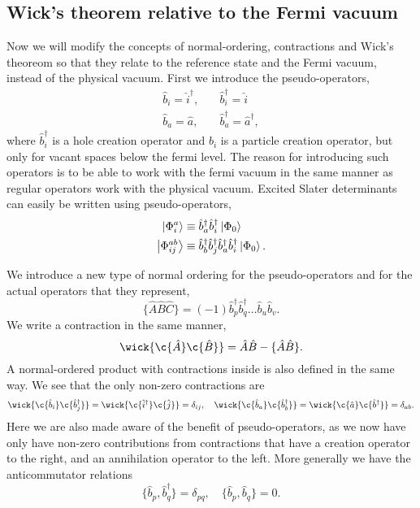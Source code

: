 	\subsection{Wick's theorem relative to the Fermi vacuum}

		Now we will modify the concepts of normal-ordering, contractions and Wick's 
        theoreom so that they relate to the reference state and the 
        Fermi vacuum, instead of the physical vacuum.
		First we introduce the pseudo-operators,
		\begin{equation}
			\begin{aligned}
				\hat{b}_i = \hat{i}^\dagger, &\quad \hat{b}_i^\dagger = \hat{i} \\
				\hat{b}_a = \hat{a}, &\quad \hat{b}_a^\dagger = \hat{a}^\dagger,
			\end{aligned}
		\end{equation}
		where $\hat{b}_i^\dagger$ is a hole creation operator and $\hat{b}_i$ is a particle
		creation operator, but only for vacant spaces below the fermi level. The reason 
		for introducing such operators is to be able to work with the fermi vacuum in the 
        same manner as regular operators work with the physical vacuum.
		Excited Slater determinants can easily be written using pseudo-operators,
		\begin{align}
			\ket{\Phi_i^a} &\equiv \hat{b}_a^\dagger\hat{b}_i^\dagger \ket{\Phi_0} \\
			\ket{\Phi_{ij}^{ab}} &\equiv 
				\hat{b}_b^\dagger \hat{b}_j^\dagger \hat{b}_a^\dagger \hat{b}_i^\dagger 
				\ket{\Phi_0}.
		\end{align}

		We introduce a new type of normal ordering for the pseudo-operators and for the
		actual operators that they represent,
		\begin{equation}
			\{\hat{A}\hat{B}\hat{C} \} 
				= (-1)\hat{b}_p^\dagger\hat{b}_q^\dagger \dots \hat{b}_u \hat{b}_v.
		\end{equation}
		We write a contraction in the same manner,
		\begin{equation}
			\wick{\c{\hat{A}}\c{\hat{B}}} = \hat{A}\hat{B} - \{\hat{A}\hat{B}\}.
		\end{equation}
		A normal-ordered product with contractions inside is also defined in the same 
		way. We see that the only non-zero contractions are
		\begin{equation}
			\wick{\c{\hat{b}_i}\c{\hat{b}_j^\dagger}} =	
			\wick{\c{\hat{i}^\dagger}\c{\hat{j}}} = \delta_{ij}, \quad
			\wick{\c{\hat{b}_a}\c{\hat{b}_b^\dagger}} =
			\wick{\c{\hat{a}}\c{\hat{b}^\dagger}} = \delta_{ab}.
		\end{equation}
        Here we are also made aware of the benefit of pseudo-operators, as we now 
        have only have non-zero contributions from contractions that have a creation 
        operator to the right, and an annihilation operator to the left. More generally 
		we have the anticommutator relations
		\begin{equation}
			\{\hat{b}_p, \hat{b}_q^\dagger\} = \delta_{pq}, \quad
			\{\hat{b}_p, \hat{b}_q\} = 0.
		\end{equation}

\clearemptydoublepage